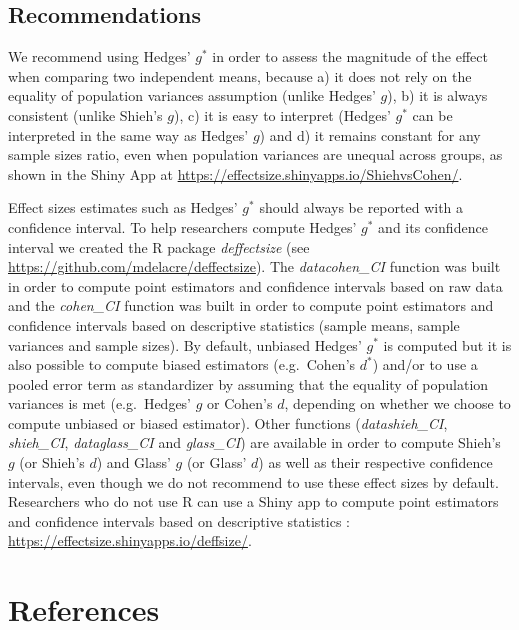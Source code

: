 \documentclass[
  english,
  man,floatsintext]{apa6}
\begin{document}
\hypertarget{recommendations}{%
\subsection{Recommendations}\label{recommendations}}

We recommend using Hedges' \(g^*\) in order to assess the magnitude of the effect when comparing two independent means, because a) it does not rely on the equality of population variances assumption (unlike Hedges' \(g\)), b) it is always consistent (unlike Shieh's \(g\)), c) it is easy to interpret (Hedges' \(g^*\) can be interpreted in the same way as Hedges' \(g\)) and d) it remains constant for any sample sizes ratio, even when population variances are unequal across groups, as shown in the Shiny App at \url{https://effectsize.shinyapps.io/ShiehvsCohen/}.

Effect sizes estimates such as Hedges' \(g^*\) should always be reported with a confidence interval. To help researchers compute Hedges' \(g^*\) and its confidence interval we created the R package \emph{deffectsize} (see \url{https://github.com/mdelacre/deffectsize}). The \emph{datacohen\_CI} function was built in order to compute point estimators and confidence intervals based on raw data and the \emph{cohen\_CI} function was built in order to compute point estimators and confidence intervals based on descriptive statistics (sample means, sample variances and sample sizes). By default, unbiased Hedges' \(g^*\) is computed but it is also possible to compute biased estimators (e.g.~Cohen's \(d^*\)) and/or to use a pooled error term as standardizer by assuming that the equality of population variances is met (e.g.~Hedges' \(g\) or Cohen's \(d\), depending on whether we choose to compute unbiased or biased estimator). Other functions (\emph{datashieh\_CI}, \emph{shieh\_CI}, \emph{dataglass\_CI} and \emph{glass\_CI}) are available in order to compute Shieh's \(g\) (or Shieh's \(d\)) and Glass' \(g\) (or Glass' \(d\)) as well as their respective confidence intervals, even though we do not recommend to use these effect sizes by default. Researchers who do not use R can use a Shiny app to compute point estimators and confidence intervals based on descriptive statistics : \url{https://effectsize.shinyapps.io/deffsize/}.

\hypertarget{references}{%
\section{References}\label{references}}
\end{document}
